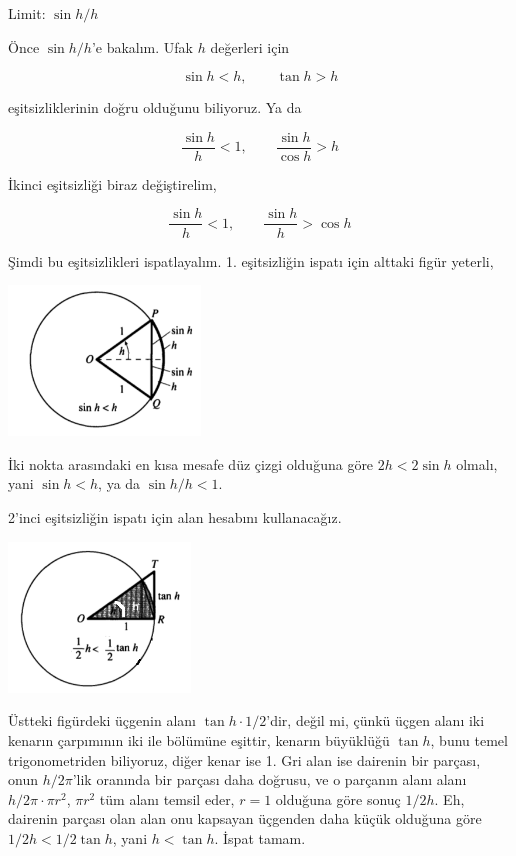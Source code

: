 \documentclass[12pt,fleqn]{article}\usepackage{../../common}
\begin{document}
Limit: $\sin h / h$

Önce $\sin h / h$'e bakalım. Ufak $h$ değerleri için 

$$ \sin h < h, \qquad \tan h > h $$

eşitsizliklerinin doğru olduğunu biliyoruz. Ya da

$$ \frac{\sin h}{h} < 1, \qquad  \frac{\sin h}{\cos h} > h $$

İkinci eşitsizliği biraz değiştirelim,

$$ \frac{\sin h}{h} < 1, \qquad  \frac{\sin h}{h} > \cos h $$

Şimdi bu eşitsizlikleri ispatlayalım. 1. eşitsizliğin ispatı için alttaki
figür yeterli,

\includegraphics[height=4cm]{ode_mattuck_93_diff_01.png}

İki nokta arasındaki en kısa mesafe düz çizgi olduğuna göre $2h < 2\sin h$
olmalı, yani $\sin h < h$, ya da $\sin h / h < 1$.

2'inci eşitsizliğin ispatı için alan hesabını kullanacağız. 

\includegraphics[height=4cm]{ode_mattuck_93_diff_02.png}

Üstteki figürdeki üçgenin alanı $\tan h \cdot 1 / 2$'dir, değil mi, çünkü
üçgen alanı iki kenarın çarpımının iki ile bölümüne eşittir, kenarın
büyüklüğü $\tan h$, bunu temel trigonometriden biliyoruz, diğer kenar ise
1. Gri alan ise dairenin bir parçası, onun $h/2\pi$'lik oranında bir
parçası daha doğrusu, ve o parçanın alanı alanı $h/2\pi \cdot \pi r^2$,
$\pi r^2$ tüm alanı temsil eder, $r=1$ olduğuna göre sonuç $1/2 h$. Eh,
dairenin parçası olan alan onu kapsayan üçgenden daha küçük olduğuna göre
$1/2 h < 1/2 \tan h$, yani $h < \tan h$. İspat tamam.
\end{document}
